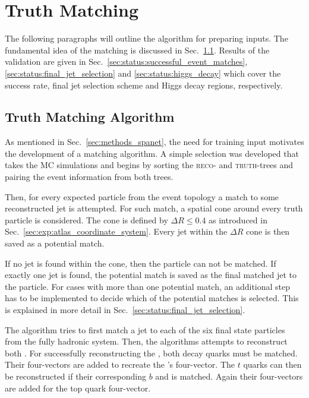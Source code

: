 \documentclass[bachelor,ngerman,english]{GAUBM}
\begin{document}
\section{Truth Matching}
\label{sec:status:truth_matching}
The following paragraphs will outline the algorithm for preparing \spanet inputs. The fundamental idea of the matching is discussed in Sec.~\ref{sec:status:truth_matching_algorithm}. Results  of the validation are given in Sec.~\ref{sec:status:successful_event_matches},\ref{sec:status:final_jet_selection} and \ref{sec:status:higgs_decay} which cover the success rate, final jet selection scheme and Higgs decay regions, respectively.
 
\subsection{Truth Matching Algorithm}
\label{sec:status:truth_matching_algorithm}
As mentioned in Sec.~\ref{sec:methods_spanet}, the need for training input motivates the development of a matching algorithm. A simple selection was developed that takes the MC simulations and begins by sorting the \textsc{reco}- and \textsc{truth}-trees and pairing the event information from both trees. 

Then, for every expected particle from the event topology a match to some reconstructed jet is attempted. For such match, a spatial cone around every truth particle is considered. The cone is defined by $\Delta R\leq0.4$ as introduced in Sec.~\ref{sec:exp:atlas_coordinate_system}. Every jet within the $\Delta R$ cone is then saved as a potential match. 

If no jet is found within the cone, then the particle can not be matched. If exactly one jet is found, the potential match is saved as the final matched jet to the particle. For cases with more than one potential match, an additional step has to be implemented to decide which of the potential matches is selected. This is explained in more detail in Sec.~\ref{sec:status:final_jet_selection}. 

The algorithm tries to first match a jet to each of the six final state particles from the fully hadronic \ttbar system. Then, the algorithms attempts to reconstruct both \wbosons. For successfully reconstructing the \wboson, both decay quarks must be matched. Their four-vectors are added to recreate the \wboson's four-vector. The $t$ quarks can then be reconstructed if their corresponding $b$ and \wboson is matched. Again their four-vectors are added for the top quark four-vector.
\end{document}
